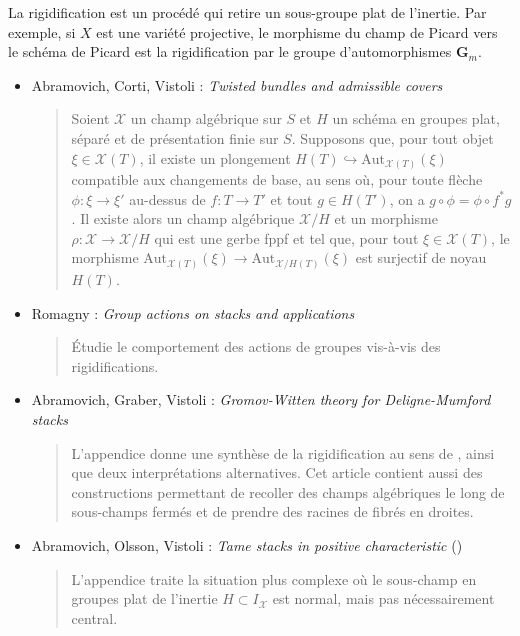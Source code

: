 \noindent
La rigidification est un procédé qui retire un sous-groupe plat de l'inertie.
Par exemple, si $X$ est une variété projective, le morphisme du champ de Picard
vers le schéma de Picard est la rigidification par le groupe d'automorphismes
$\mathbf{G}_m$.
\begin{itemize}
\item Abramovich, Corti, Vistoli :
\emph{Twisted bundles and admissible covers} \cite{acv}
\begin{quote}
Soient $\mathcal{X}$ un champ algébrique sur $S$ et $H$ un schéma en groupes
plat, séparé et de présentation finie sur $S$. Supposons que, pour tout objet
$\xi \in \mathcal{X}(T)$, il existe un plongement
$H(T) \hookrightarrow \text{Aut}_{\mathcal{X}(T)}(\xi)$ compatible aux
changements de base, au sens où, pour toute flèche
$\phi : \xi \rightarrow \xi'$ au-dessus de $f: T \rightarrow T'$ et tout
$g \in H(T')$, on a $g \circ \phi = \phi \circ f^*g$.
Il existe alors un champ algébrique $\mathcal{X}/H$ et un morphisme
$\rho : \mathcal{X} \rightarrow \mathcal{X}/H$ qui est une gerbe fppf et tel
que, pour tout $\xi \in \mathcal{X}(T)$, le morphisme
$\text{Aut}_{\mathcal{X}(T)} (\xi)
\rightarrow \text{Aut}_{\mathcal{X}/H (T)} (\xi) $
est surjectif de noyau $H(T)$.
\end{quote}
\item Romagny : \emph{Group actions on stacks and applications}
\cite{romagny_actions}
\begin{quote}
Étudie le comportement des actions de groupes vis-à-vis des rigidifications.
\end{quote}
\item Abramovich, Graber, Vistoli :
\emph{Gromov-Witten theory for Deligne-Mumford stacks} \cite{agv}
\begin{quote}
L'appendice donne une synthèse de la rigidification au sens de \cite{acv},
ainsi que deux interprétations alternatives. Cet article contient aussi des
constructions permettant de recoller des champs algébriques le long de
sous-champs fermés et de prendre des racines de fibrés en droites.
\end{quote}
\item
Abramovich, Olsson, Vistoli : \emph{Tame stacks in positive characteristic}
(\cite{tame})
\begin{quote}
L'appendice traite la situation plus complexe où le sous-champ en groupes plat
de l'inertie $H \subset I_\mathcal{X}$ est normal, mais pas nécessairement
central.
\end{quote}
\end{itemize}

